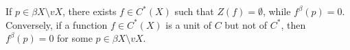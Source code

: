 If $p \in \beta X \setminus vX$, there exists $f \in C^*(X)$ such that $Z(f) = \emptyset$, while $f^\beta(p) = 0$. Conversely, if a function $f \in C^*(X)$ is a unit of $C$ but not of $C^*$, then $f^\beta(p) = 0$ for some $p \in \beta X \setminus vX$.
